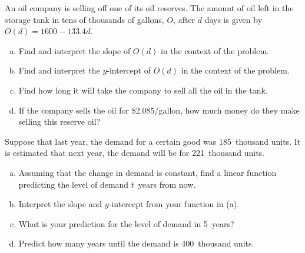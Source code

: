 \documentclass[11pt,letterpaper]{article}
\begin{document}

 An oil company is selling off one of its oil reserves. The amount of oil left in the storage tank in tens of thousands of gallons, $O$, after $d$ days is given by $O(d)= 1600 - 133.4d$.
	\begin{enumerate}[(a)]
	\item Find and interpret the slope of $O(d)$ in the context of the problem.
	\item Find and interpret the $y$-intercept of $O(d)$ in the context of the problem.
	\item Find how long it will take the company to sell all the oil in the tank. 
	\item If the company sells the oil for \$2.085/gallon, how much money do they make selling this reserve oil?
	\end{enumerate}



\newpage



 Suppose that last year, the demand for a certain good was 185~thousand units. It is estimated that next year, the demand will be for 221~thousand units. 
	\begin{enumerate}[(a)]
	\item Assuming that the change in demand is constant, find a linear function predicting the level of demand $t$~years from now.
	\item Interpret the slope and $y$-intercept from your function in (a).
	\item What is your prediction for the level of demand in 5~years?
	\item Predict how many years until the demand is 400~thousand units. 
	\end{enumerate}
\end{document}
